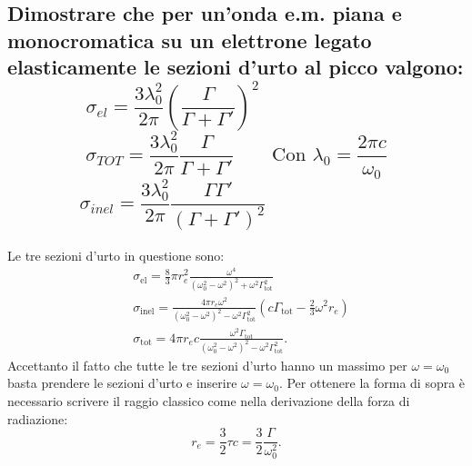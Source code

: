 \subsection[\hspace{2mm} Valori nel picco per le sezioni d'urto di onda su elettrone legato elasticamente]{Dimostrare che per un’onda e.m. piana e monocromatica su un elettrone legato elasticamente le sezioni d'urto al picco valgono:
\[
	\sigma_{el} = \frac{3 \lambda_{0}^2}{2 \pi} \left( \frac{\Gamma}{\Gamma + \Gamma'} \right)^2 \quad \quad \quad \quad \quad \quad \text{ }
\]
\[
	\sigma_{TOT} = \frac{3 \lambda_{0}^2}{2 \pi} \frac{\Gamma}{\Gamma + \Gamma'} \quad \quad \text{Con $\lambda_{0} = \frac{2 \pi c}{\omega_{0}}$}
\]
\[
	\sigma_{inel} = \frac{3 \lambda_{0}^2}{2 \pi} \frac{\Gamma \Gamma'}{\left( \Gamma + \Gamma' \right)^2 } \quad \quad \quad \quad \quad \quad \text{ } 
\]
}
Le tre sezioni d'urto in questione sono:
\begin{align*}
	&\sigma_{\text{el}}= \frac{8}{3}\pi r_e^2 \frac{\omega^4}{\left( \omega_0^2-\omega^2 \right)^2+\omega^2\Gamma_{\text{tot}}^2} \\
	&\sigma_{\text{inel}}= \frac{4\pi r_e\omega^2}{\left(\omega_0^2-\omega^2\right)^2-\omega^2\Gamma_{\text{tot}}^2}
	\left(c\Gamma_{\text{tot}}-\frac{2}{3}\omega^2r_e\right)  \\
	&\sigma_{\text{tot}}= 4\pi r_e c \frac{\omega^2\Gamma_{\text{tot}}}{\left( \omega_0^2-\omega^2 \right)^2-\omega^2\Gamma_{\text{tot}}^2}
.\end{align*}
Accettanto il fatto che tutte le tre sezioni d'urto hanno un massimo per $\omega = \omega_0$ basta prendere le sezioni d'urto e inserire $\omega = \omega_0$. Per ottenere la forma di sopra è necessario scrivere il raggio classico come nella derivazione della forza di radiazione:
\[
	r_e = \frac{3}{2}\tau c= \frac{3}{2} \frac{\Gamma}{\omega_0^2}
.\] 

